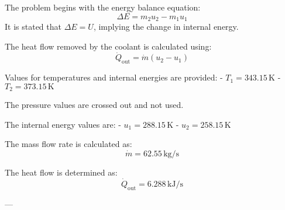 The problem begins with the energy balance equation:  
\[
\Delta E = m_2 u_2 - m_1 u_1
\]  
It is stated that \(\Delta E = U\), implying the change in internal energy.  

The heat flow removed by the coolant is calculated using:  
\[
\dot{Q}_{\text{out}} = \dot{m} (u_2 - u_1)
\]  

Values for temperatures and internal energies are provided:  
- \(T_1 = 343.15 \, \text{K}\)  
- \(T_2 = 373.15 \, \text{K}\)  

The pressure values are crossed out and not used.  

The internal energy values are:  
- \(u_1 = 288.15 \, \text{K}\)  
- \(u_2 = 258.15 \, \text{K}\)  

The mass flow rate is calculated as:  
\[
\dot{m} = 62.55 \, \text{kg/s}
\]  

The heat flow is determined as:  
\[
\dot{Q}_{\text{out}} = 6.288 \, \text{kJ/s}
\]  

---